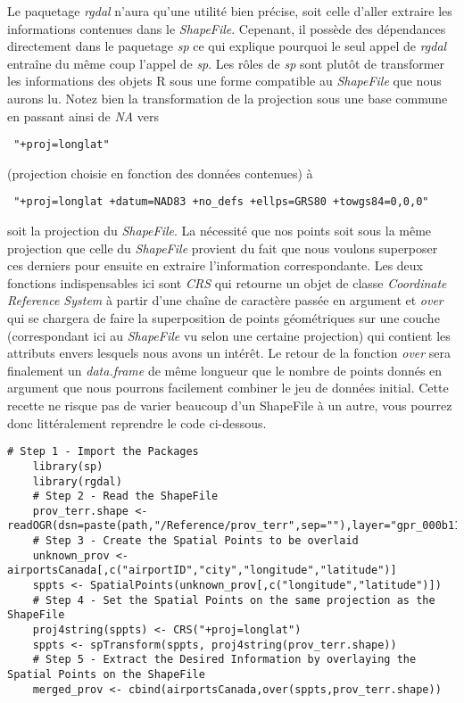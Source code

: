 Le paquetage \emph{rgdal} n'aura qu'une utilité bien précise, soit celle d'aller extraire les informations contenues dans le \emph{ShapeFile}. Cepenant, il possède des dépendances directement dans le paquetage \emph{sp} ce qui explique pourquoi le seul appel de \emph{rgdal} entraîne du même coup l'appel de \emph{sp}. Les rôles de \emph{sp} sont plutôt de transformer les informations des objets R sous une forme compatible au \emph{ShapeFile} que nous aurons lu. Notez bien la transformation de la projection sous une base commune en passant ainsi de \emph{NA} vers \begin{verbatim} "+proj=longlat" \end{verbatim} (projection choisie en fonction des données contenues) à \begin{verbatim} "+proj=longlat +datum=NAD83 +no_defs +ellps=GRS80 +towgs84=0,0,0" \end{verbatim} soit la projection du \emph{ShapeFile}. La nécessité que nos points soit sous la même projection que celle du \emph{ShapeFile} provient du fait que nous voulons superposer ces derniers pour ensuite en extraire l'information correspondante. Les deux fonctions indispensables ici sont \emph{CRS} qui retourne un objet de classe \emph{Coordinate Reference System} à partir d'une chaîne de caractère passée en argument et \emph{over} qui se chargera de faire la superposition de points géométriques sur une couche (correspondant ici au \emph{ShapeFile} vu selon une certaine projection) qui contient les attributs envers lesquels nous avons un intérêt. Le retour de la fonction \emph{over} sera finalement un \emph{data.frame} de même longueur que le nombre de points donnés en argument que nous pourrons facilement combiner le jeu de données initial. Cette recette ne risque pas de varier beaucoup d'un ShapeFile à un autre, vous pourrez donc littéralement reprendre le code ci-dessous. \\

\begin{lstlisting}[caption = Traitement standard de données géospatiales en R,label=src:GeoDataR]
	# Step 1 - Import the Packages	
	library(sp)
	library(rgdal)
	# Step 2 - Read the ShapeFile
	prov_terr.shape <- readOGR(dsn=paste(path,"/Reference/prov_terr",sep=""),layer="gpr_000b11a_e")
	# Step 3 - Create the Spatial Points to be overlaid
	unknown_prov <- airportsCanada[,c("airportID","city","longitude","latitude")]
	sppts <- SpatialPoints(unknown_prov[,c("longitude","latitude")])
	# Step 4 - Set the Spatial Points on the same projection as the ShapeFile
	proj4string(sppts) <- CRS("+proj=longlat")
	sppts <- spTransform(sppts, proj4string(prov_terr.shape))
	# Step 5 - Extract the Desired Information by overlaying the Spatial Points on the ShapeFile
	merged_prov <- cbind(airportsCanada,over(sppts,prov_terr.shape))
\end{lstlisting}

